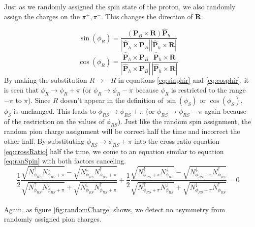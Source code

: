\documentclass[abstract = on,listof=totoc, bibliography=totoc]{scrreprt}
\newcommand{\phirs}{\phi_{RS}}
\newcommand{\pip}{\pi^+}
\newcommand{\pim}{\pi^-}
\begin{document}
Just as we randomly assigned the spin state of the proton, we also randomly assign the charges on the $\pip,\pim$. This changes the direction of $\bm{R}$. 

\begin{equation}
\label{eq:sinphir}
\sin(\phi_R) = \frac{(\bm{P}_B \times \bm{R})  \bm{\hat{P}}_h}{|\bm{\hat{P}}_h \times \bm{P}_B||\bm{\hat{P}}_h \times \bm{R}|}
\end{equation}
\begin{equation}
\label{eq:cosphir}
\cos(\phi_R) = \frac{\bm{\hat{P}}_h \times \bm{P}_B}{|\bm{\hat{P}}_h \times \bm{P}_B|}  \frac{\bm{\hat{P}}_h\times \bm{R}}{|\bm{\hat{P}}_h\times \bm{R}|}
\end{equation}
%
By making the substitution $R\rightarrow -R$ in equations \ref{eq:sinphir} and \ref{eq:cosphir}, it is seen that $\phi_R \rightarrow \phi_R + \pi$ (or $\phi_R \rightarrow \phi_R - \pi$ because $\phi_R$ is restricted to the range $-\pi$ to  $\pi$). Since $R$ doesn't appear in the definition of $\sin(\phi_S)$ or $\cos(\phi_S)$, $\phi_S$ is unchanged. This leads to $\phirs \rightarrow \phirs + \pi$ (or $\phirs \rightarrow \phirs - \pi$ again because of the restriction on the values of $\phirs$). Just like the random spin assignment, the random pion charge assignment will be correct half the time and incorrect the other half. By substituting $\phirs \rightarrow \phirs \pm \pi$ into the cross ratio equation \ref{eq:crossRatio} half the time, we come to an equation similar to equation \ref{eq:ranSpin} with both factors canceling.
\begin{equation}
\label{eq:ranCharge}
\frac{1}{2}\frac{\sqrt{N^\uparrow_{\phi_{RS}}N^\downarrow_{\phi_{RS}+\pi}} - \sqrt{N^\downarrow_{\phi_{RS}}N^\uparrow_{\phi_{RS}+\pi}}}{\sqrt{N^\uparrow_{\phi_{RS}}N^\downarrow_{\phi_{RS}+\pi}} + \sqrt{N^\downarrow_{\phi_{RS}}N^\uparrow_{\phi_{RS}+\pi}}}
+
\frac{1}{2}\frac{\sqrt{N^\uparrow_{\phi_{RS}+\pi}N^\downarrow_{\phi_{RS}}} - \sqrt{N^\downarrow_{\phi_{RS}+\pi}N^\uparrow_{\phi_{RS}}}}{\sqrt{N^\uparrow_{\phi_{RS}+\pi}N^\downarrow_{\phi_{RS}}} + \sqrt{N^\downarrow_{\phi_{RS}+\pi}N^\uparrow_{\phi_{RS}}}} = 0
\end{equation}\\
Again, as figure \ref{fig:randomCharge} shows, we detect no asymmetry from randomly assigned pion charges.

\end{document}
